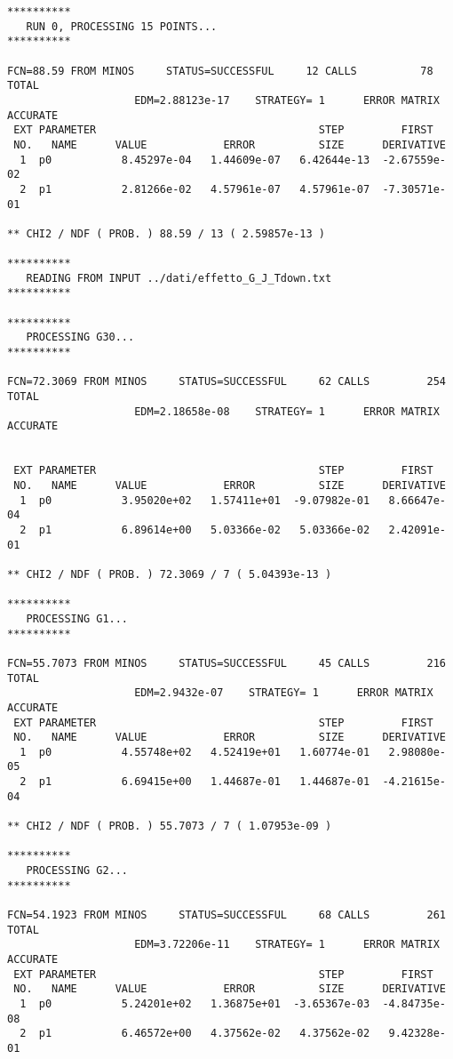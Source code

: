{\fontsize{6}{6}
\begin{verbatim}
**********
   RUN 0, PROCESSING 15 POINTS...
**********

FCN=88.59 FROM MINOS     STATUS=SUCCESSFUL     12 CALLS          78 TOTAL
                    EDM=2.88123e-17    STRATEGY= 1      ERROR MATRIX ACCURATE 
 EXT PARAMETER                                   STEP         FIRST   
 NO.   NAME      VALUE            ERROR          SIZE      DERIVATIVE 
  1  p0           8.45297e-04   1.44609e-07   6.42644e-13  -2.67559e-02
  2  p1           2.81266e-02   4.57961e-07   4.57961e-07  -7.30571e-01

** CHI2 / NDF ( PROB. ) 88.59 / 13 ( 2.59857e-13 )

**********
   READING FROM INPUT ../dati/effetto_G_J_Tdown.txt
**********

**********
   PROCESSING G30...
**********

FCN=72.3069 FROM MINOS     STATUS=SUCCESSFUL     62 CALLS         254 TOTAL
                    EDM=2.18658e-08    STRATEGY= 1      ERROR MATRIX ACCURATE 

                    
 EXT PARAMETER                                   STEP         FIRST   
 NO.   NAME      VALUE            ERROR          SIZE      DERIVATIVE 
  1  p0           3.95020e+02   1.57411e+01  -9.07982e-01   8.66647e-04
  2  p1           6.89614e+00   5.03366e-02   5.03366e-02   2.42091e-01

** CHI2 / NDF ( PROB. ) 72.3069 / 7 ( 5.04393e-13 )

**********
   PROCESSING G1...
**********

FCN=55.7073 FROM MINOS     STATUS=SUCCESSFUL     45 CALLS         216 TOTAL
                    EDM=2.9432e-07    STRATEGY= 1      ERROR MATRIX ACCURATE 
 EXT PARAMETER                                   STEP         FIRST   
 NO.   NAME      VALUE            ERROR          SIZE      DERIVATIVE 
  1  p0           4.55748e+02   4.52419e+01   1.60774e-01   2.98080e-05
  2  p1           6.69415e+00   1.44687e-01   1.44687e-01  -4.21615e-04

** CHI2 / NDF ( PROB. ) 55.7073 / 7 ( 1.07953e-09 )

**********
   PROCESSING G2...
**********

FCN=54.1923 FROM MINOS     STATUS=SUCCESSFUL     68 CALLS         261 TOTAL
                    EDM=3.72206e-11    STRATEGY= 1      ERROR MATRIX ACCURATE 
 EXT PARAMETER                                   STEP         FIRST   
 NO.   NAME      VALUE            ERROR          SIZE      DERIVATIVE 
  1  p0           5.24201e+02   1.36875e+01  -3.65367e-03  -4.84735e-08
  2  p1           6.46572e+00   4.37562e-02   4.37562e-02   9.42328e-01


\end{verbatim}}

